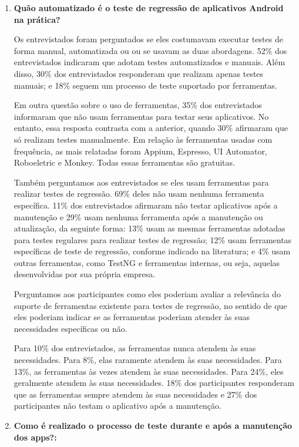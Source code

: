 \begin{enumerate}[label=\bf QP\arabic*]
    
\item \textbf{Quão automatizado é o teste de regressão de aplicativos Android na prática?}
    
Os entrevistados foram perguntados se eles costumavam executar testes de forma manual, automatizada ou ou se usavam as duas abordagens. 52\% dos entrevistados indicaram que adotam testes automatizados e manuais. Além disso, 30\% dos entrevistados responderam que realizam apenas testes manuais; e 18\% seguem um processo de teste suportado por ferramentas.
 
Em outra questão sobre o uso de ferramentas, 35\% dos entrevistados informaram que não usam ferramentas para testar seus aplicativos. No entanto, essa resposta contrasta com a anterior, quando 30\% afirmaram que só realizam testes manualmente. Em relação às ferramentas usadas com frequência, as mais relatadas foram Appium, Espresso, UI Automator, Roboeletric e Monkey. Todas essas ferramentas são gratuitas.
 
Também perguntamos aos entrevistados se eles usam ferramentas para realizar testes de regressão. 69\% deles não usam nenhuma ferramenta específica. 11\% dos entrevistados afirmaram não testar aplicativos após a manutenção e 29\% usam nenhuma ferramenta após a manutenção ou atualização, da seguinte forma: 13\% usam as mesmas ferramentas adotadas para testes regulares para realizar testes de regressão; 12\% usam ferramentas específicas de teste de regressão, conforme indicado na literatura; e 4\% usam outras ferramentas, como TestNG e ferramentas internas, ou seja, aquelas desenvolvidas por sua própria empresa.

Perguntamos aos participantes como eles poderiam avaliar a relevância do suporte de ferramentas existente para testes de regressão, no sentido de que eles poderiam indicar se as ferramentas poderiam atender às suas necessidades específicas ou não.

Para 10\% dos entrevistados, as ferramentas nunca atendem às suas necessidades. Para 8\%, elas raramente atendem às suas necessidades. Para 13\%, as ferramentas às vezes atendem às suas necessidades. Para 24\%, eles geralmente atendem às suas necessidades. 18\% dos participantes responderam que as ferramentas sempre atendem às suas necessidades e 27\% dos participantes não testam o aplicativo após a manutenção.
    
\item \textbf{Como é realizado o processo de teste durante e após a manutenção dos apps?:}


\end{enumerate}
